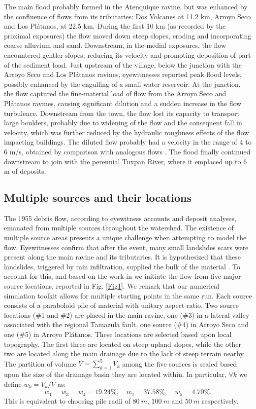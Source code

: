 \documentclass[nhess, manuscript]{copernicus}
\begin{document}
The main flood probably formed in the Atenquique ravine, but was enhanced by the confluence of flows from its tributaries: Dos Volcanes at 11.2 km, Arroyo Seco and Los Pl\'atanos, at 22.5 km. During the first 10 km (as recorded by the proximal exposures) the flow moved down steep slopes, eroding and incorporating coarse alluvium and sand. Downstream, in the medial exposures, the flow encountered gentler slopes, reducing its velocity and promoting deposition of part of the sediment load. Just upstream of the village, below the junction with the Arroyo Seco and Los Pl\'atanos ravines, eyewitnesses reported peak flood levels, possibly enhanced by the engulfing of a small water reservoir. At the junction, the flow captured the fine-material load of flow from the Arroyo Seco and Pl\'atanos ravines, causing significant dilution and a sudden increase in the flow turbulence. Downstream from the town, the flow lost its capacity to transport large boulders, probably due to widening of the flow and the consequent fall in velocity, which was further reduced by the hydraulic roughness effects of the flow impacting buildings. The diluted flow probably had a velocity in the range of 4 to 6 m/s, obtained by comparison with analogous flows \citep{Pierson1985, Saucedo2008}. The flood finally continued downstream to join with the perennial Tuxpan River, where it emplaced up to 6 m of deposits.

\subsection{Multiple sources and their locations}
The 1955 debris flow, according to eyewitness accounts and deposit analyses, emanated from multiple sources throughout the watershed. The existence of multiple source areas presents a unique challenge when attempting to model the flow. Eyewitnesses confirm that after the event, many small landslides scars were present along the main ravine and its tributaries. It is hypothesized that these landslides, triggered by rain infiltration, supplied the bulk of the material \citep{Saucedo2003, Saucedo2008}. To account for this, and based on the work in \cite{Rupp2004} we initiate the flow from five major source locations, reported in Fig. \ref{Fig1}. We remark that our numerical simulation toolkit allows for multiple starting points in the same run. Each source consists of a paraboloid pile of material with unitary aspect ratio. Two source locations (\#1 and \#2) are placed in the main ravine, one (\#3) in a lateral valley associated with the regional Tamazula fault, one source (\#4) in Arroyo Seco and one (\#5) in Arroyo Pl\'atanos. These locations are selected based upon local topography. The first three are located on steep upland slopes, while the other two are located along the main drainage due to the lack of steep terrain nearby \citep{Rupp2004}. The partition of volume $V=\sum^5_{k=1} V_k$ among the five sources is scaled based upon the size of the drainage basin they are located within. In particular, $\forall k$ we define $w_k=V_k/V$ as:
$$w_1=w_3=w_4=19.24\%, \quad w_2=37.58\%, \quad w_5=4.70\%.$$
This is equivalent to choosing pile radii of $80\ m$, $100\ m$ and $50\ m$ respectively.
\end{document}
